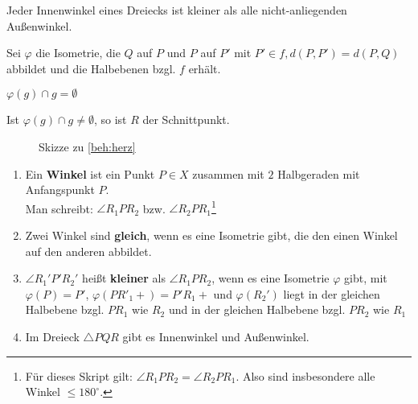 \begin{bemerkung}
    Jeder Innenwinkel eines Dreiecks ist kleiner als alle nicht-anliegenden
    Außenwinkel.
\end{bemerkung}

\begin{beweis}
    Sei $\varphi$ die Isometrie, die $Q$ auf $P$ und $P$ auf $P'$
    mit $P' \in f, d(P,P') = d(P, Q)$ abbildet und die Halbebenen
    bzgl. $f$ erhält.
\end{beweis}

\begin{behauptung}[Herz]\label{beh:herz}
    $\varphi(g) \cap g = \emptyset$
\end{behauptung}

\begin{beweis}
    Ist $\varphi(g) \cap g \neq \emptyset$, so ist $R$ der Schnittpunkt.
\end{beweis}

\begin{figure}[htp]
    \centering
    
    \caption{Skizze zu \cref{beh:herz}}
    \label{fig:bild-6}
\end{figure}

\begin{definition}\label{def:14.8}%
    \begin{enumerate}[label=\alph*),ref=\alph*]
        \item \label{def:14.8a} Ein \textbf{Winkel} ist ein Punkt $P \in X$ 
              zusammen mit $2$ Halbgeraden mit Anfangspunkt $P$.\\
              Man schreibt: $\angle R_1 P R_2$ bzw. $\angle R_2 P R_1$\footnote{Für dieses Skript gilt: $\angle R_1 P R_2 = \angle R_2 P R_1$. Also sind insbesondere alle Winkel $ \leq 180^\circ$.}
        \item Zwei Winkel sind \textbf{gleich}, wenn es eine Isometrie gibt, 
              die den einen Winkel auf den anderen abbildet.
        \item \label{def:14.8c} $\angle R_1' P' R_2'$ heißt \textbf{kleiner} als
              $\angle R_1 P R_2$, wenn es eine Isometrie $\varphi$
              gibt, mit $\varphi(P) = P'$, $\varphi(PR'_1+) = P' R_1 +$
              und $\varphi(R_2')$ liegt in der gleichen Halbebene 
              bzgl. $PR_1$ wie $R_2$ und in der gleichen Halbebene
              bzgl. $PR_2$ wie $R_1$
        \item \label{def:14.8d} Im Dreieck $\triangle PQR$ gibt es Innenwinkel und
              Außenwinkel.
    \end{enumerate}
\end{definition}

